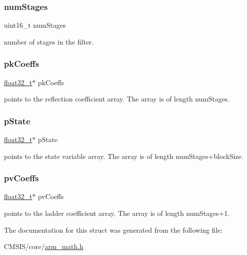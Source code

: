 \subsubsection{\texorpdfstring{numStages}{numStages}}
{\footnotesize\ttfamily uint16\+\_\+t num\+Stages}

number of stages in the filter. \mbox{\label{structarm__iir__lattice__instance__f32_a994889c5c4a866c50a0ee63326378816}} 
\subsubsection{\texorpdfstring{pkCoeffs}{pkCoeffs}}
{\footnotesize\ttfamily \mbox{\hyperlink{arm__math_8h_a4611b605e45ab401f02cab15c5e38715}{float32\+\_\+t}}$\ast$ pk\+Coeffs}

points to the reflection coefficient array. The array is of length num\+Stages. \mbox{\label{structarm__iir__lattice__instance__f32_a335c87e6fdc4b96601d95a5de8b9c463}} 
\subsubsection{\texorpdfstring{pState}{pState}}
{\footnotesize\ttfamily \mbox{\hyperlink{arm__math_8h_a4611b605e45ab401f02cab15c5e38715}{float32\+\_\+t}}$\ast$ p\+State}

points to the state variable array. The array is of length num\+Stages+block\+Size. \mbox{\label{structarm__iir__lattice__instance__f32_a0f8815744fade9c580d44277ff802308}} 
\subsubsection{\texorpdfstring{pvCoeffs}{pvCoeffs}}
{\footnotesize\ttfamily \mbox{\hyperlink{arm__math_8h_a4611b605e45ab401f02cab15c5e38715}{float32\+\_\+t}}$\ast$ pv\+Coeffs}

points to the ladder coefficient array. The array is of length num\+Stages+1. 

The documentation for this struct was generated from the following file\+:\begin{DoxyCompactItemize}
\item 
C\+M\+S\+I\+S/core/\mbox{\hyperlink{arm__math_8h}{arm\+\_\+math.\+h}}\end{DoxyCompactItemize}
